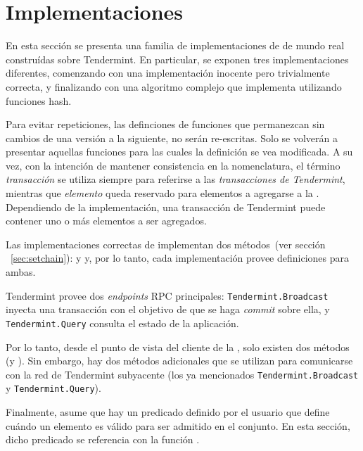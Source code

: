 \section{Implementaciones}\label{sec:impl}

En esta sección se presenta una familia de implementaciones de \setchain de mundo
real construídas sobre Tendermint. 
%
En particular, se exponen tres implementaciones diferentes, comenzando con una
implementación inocente pero trivialmente correcta, y finalizando con una algoritmo
complejo que implementa \setchain utilizando funciones hash.
%

Para evitar repeticiones, las definciones de funciones que permanezcan sin cambios
de una versión a la siguiente, no serán re-escritas. Solo se volverán a presentar
aquellas funciones para las cuales la definición se vea modificada.
%
A su vez, con la intención de mantener consistencia en la nomenclatura, el término \textit{transacción}
se utiliza siempre para referirse a las \textit{transacciones de Tendermint}, mientras
que \textit{elemento} queda reservado para elementos a agregarse a la \setchain.
%
Dependiendo de la implementación, una transacción de Tendermint puede contener uno
o más elementos a ser agregados.


Las implementaciones correctas de \setchain implementan dos métodos~(ver sección
~\ref{sec:setchain}): \Add y \Get y, por lo tanto, cada implementación provee definiciones
para ambas.
%

Tendermint provee dos \textit{endpoints} RPC principales: \texttt{Tendermint.Broadcast}
inyecta una transacción con el objetivo de que se haga \textit{commit} sobre ella, y
\texttt{Tendermint.Query} consulta el estado de la aplicación.
%

Por lo tanto, desde el punto de vista del cliente de la \setchain, solo existen dos
métodos (\Add y \Get).
%
Sin embargo, hay dos métodos adicionales que se utilizan para comunicarse con la
red de Tendermint subyacente (los ya mencionados \texttt{Tendermint.Broadcast} y
\texttt{Tendermint.Query}).
%

Finalmente, \setchain asume que hay un predicado definido por el usuario que define
cuándo un elemento es válido para ser admitido en el conjunto.
%
En esta sección, dicho predicado se referencia con la función \isValidElement.

